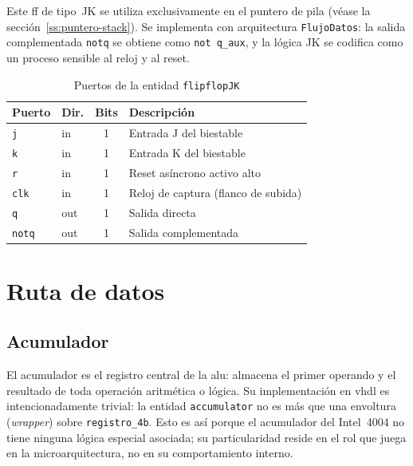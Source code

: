 \documentclass[%
    school=etsisi,%
    type=pfg,%
    degree=61CI,%
]{upm-report}
\newcommand{\vhdlfile}[1]{%
    \par\noindent{\small\sffamily\color{gray}Fichero: \texttt{#1}}\par\smallskip
}
\begin{document}
Este \acrshort{ff} de tipo~JK se utiliza exclusivamente en el puntero de pila
(véase la sección~\ref{ss:puntero-stack}).  Se implementa con arquitectura
\texttt{FlujoDatos}: la salida complementada \texttt{notq} se obtiene como
\texttt{not~q\_aux}, y la lógica JK se codifica como un proceso sensible al
reloj y al reset.

\begin{table}[H]
\centering
\caption{Puertos de la entidad \texttt{flipflopJK}}
\label{tab:ff-jk}
\begin{tabularx}{\textwidth}{@{}llcX@{}}
\toprule
\textbf{Puerto} & \textbf{Dir.} & \textbf{Bits} & \textbf{Descripción} \\
\midrule
\texttt{j}    & in  & 1 & Entrada J del biestable \\
\texttt{k}    & in  & 1 & Entrada K del biestable \\
\texttt{r}    & in  & 1 & Reset asíncrono activo alto \\
\texttt{clk}  & in  & 1 & Reloj de captura (flanco de subida) \\
\texttt{q}    & out & 1 & Salida directa \\
\texttt{notq} & out & 1 & Salida complementada \\
\bottomrule
\end{tabularx}
\end{table}

\section{Ruta de datos}
\label{s:ruta-datos}

\subsection{Acumulador}
\label{ss:accumulator}
\vhdlfile{accumulator.vhd}

El acumulador es el registro central de la \acrshort{alu}: almacena el primer
operando y el resultado de toda operación aritmética o lógica.  Su
implementación en \acrshort{vhdl} es intencionadamente trivial: la entidad
\texttt{accumulator} no es más que una envoltura (\textit{wrapper}) sobre
\texttt{registro\_4b}.  Esto es así porque el acumulador del Intel~4004 no
tiene ninguna lógica especial asociada; su particularidad reside en el rol
que juega en la microarquitectura, no en su comportamiento interno.
\end{document}
